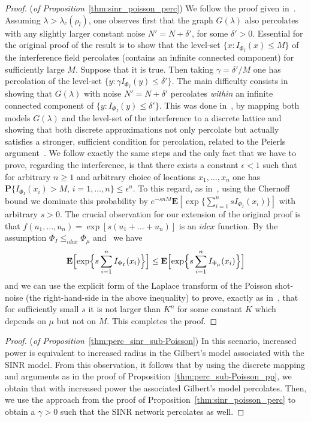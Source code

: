 \documentclass[conference]{IEEEtran}
\begin{document}
\begin{proof}({\em of Proposition}~\ref{thm:sinr_poisson_perc})
We follow the proof  given in~\cite{Dousse_etal}.
Assuming $\lambda>\lambda_c(\rho_l)$, one observes first
that the graph $G(\lambda)$ also percolates
with any slightly larger constant noise
$N'=N+\delta'$, for some $\delta'>0$.
Essential for the original proof of the result 
is to show that the
level-set $\{x:I_{\Phi_I}(x)\le M\}$ of the interference
field  percolates (contains an infinite connected component) for sufficiently
large $M$. Suppose that it is true. 
Then taking $\gamma=\delta'/M$ one has 
percolation of the level-set $\{y:\gamma I_{\Phi_I}(y)\le \delta'\}$.
The main difficulty consists in showing that 
$G(\lambda)$ with noise $N'=N+\delta'$ 
percolates {\em within} an infinite connected component of 
$\{y:I_{\Phi_I}(y)\le \delta'\}$. This was done in~\cite{Dousse_etal}, 
by mapping both models $G(\lambda)$ and the level-set of the
interference to a discrete lattice
and showing that both discrete approximations not only percolate 
but actually satisfies a stronger, sufficient condition for
percolation, related to the Peierls argument~\cite[Proposition 14.1.4]{FnT1}. 
We follow exactly the same steps and the only fact that we have to
prove,  regarding  the interference, is that there exists a constant
$\epsilon<1$ such that for arbitrary $n\ge1$ and 
arbitrary choice of locations $x_1,\ldots,x_n$ one has 
${{\mathbf P}}\{I_{\Phi_I}(x_i)> M, \, i=1,\ldots, n\}\le \epsilon^n$.
To this regard, as in~\cite{Dousse_etal}, 
using the Chernoff bound we dominate this probability by 
$e^{-snM}{{\mathbf E}}[\exp\{\sum_{i=1}^nsI_{\Phi_I}(x_i)\}]$ with arbitrary
$s>0$. The crucial observation for our extension of the original proof
is that $f(u_1,\ldots,u_n)=\exp[s(u_1+\ldots+u_n)]$ is an
$idcx$ function. By the assumption $\Phi_I\le_{idcx}\Phi_\mu$ 
and~\cite[Theorem~2.1]{snorder} we have 
$${{\mathbf E}}\Bigl[\exp\Bigl\{s\sum_{i=1}^nI_{\Phi_I}(x_i)\Bigr\}\Bigr]\le
{{\mathbf E}}\Bigl[\exp\Bigl\{s\sum_{i=1}^nI_{\Phi_\mu}(x_i)\Bigr\}\Bigr]$$ 
and we can use the explicit form
of the Laplace transform of the Poisson shot-noise (the
right-hand-side in the above inequality) to prove, exactly as
in~\cite{Dousse_etal}, that for sufficiently small $s$
it is not larger than $K^n$ for some
constant $K$  which depends on $\mu$ but not on $M$.
This completes the proof.
\end{proof}

\begin{proof}({\em of Proposition}~\ref{thm:perc_sinr_sub-Poisson})
In this scenario, increased power is equivalent to increased radius in
the Gilbert's model associated with the SINR model. From this
observation, it follows that by using the discrete mapping and
arguments as in the proof of 
Proposition~\ref{thm:perc_sub-Poisson_pp}, we obtain that with
increased power the associated Gilbert's model percolates. Then, we
use the approach from the proof of
Proposition~\ref{thm:sinr_poisson_perc} to obtain 
a $\gamma > 0$ such that the SINR network percolates as well. 
\end{proof}

\singlespacing

{\footnotesize 

}
\end{document}
